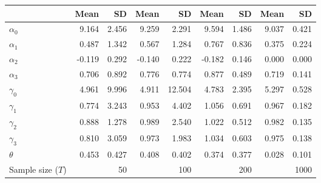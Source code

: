 
\begin{tabular}[t]{lrrrrrrrr}
\toprule
  & Mean & SD & Mean  & SD  & Mean   & SD   & Mean    & SD   \\
\midrule
$\alpha_{0}$ & 9.164 & 2.456 & 9.259 & 2.291 & 9.594 & 1.486 & 9.037 & 0.421\\
$\alpha_{1}$ & 0.487 & 1.342 & 0.567 & 1.284 & 0.767 & 0.836 & 0.375 & 0.224\\
$\alpha_{2}$ & -0.119 & 0.292 & -0.140 & 0.222 & -0.182 & 0.146 & 0.000 & 0.000\\
$\alpha_{3}$ & 0.706 & 0.892 & 0.776 & 0.774 & 0.877 & 0.489 & 0.719 & 0.141\\
$\gamma_{0}$ & 4.961 & 9.996 & 4.911 & 12.504 & 4.783 & 2.395 & 5.297 & 0.528\\
$\gamma_{1}$ & 0.774 & 3.243 & 0.953 & 4.402 & 1.056 & 0.691 & 0.967 & 0.182\\
$\gamma_{2}$ & 0.888 & 1.278 & 0.989 & 2.540 & 1.022 & 0.512 & 0.982 & 0.135\\
$\gamma_{3}$ & 0.810 & 3.059 & 0.973 & 1.983 & 1.034 & 0.603 & 0.975 & 0.138\\
$\theta$ & 0.453 & 0.427 & 0.408 & 0.402 & 0.374 & 0.377 & 0.028 & 0.101\\
Sample size ($T$) &  & 50 &  & 100 &  & 200 &  & 1000\\
\bottomrule
\end{tabular}
